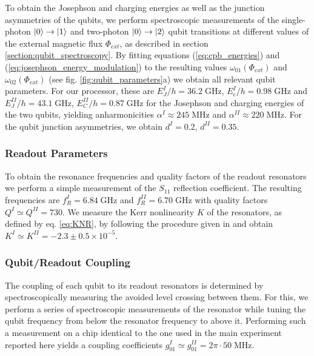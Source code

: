 To obtain the Josephson and charging energies as well as the junction asymmetries of the qubits, we perform spectroscopic measurements of the single-photon $\left| 0 \right>\to \left| 1 \right>$ and two-photon $\left| 0 \right>\to\left| 2 \right>$ qubit transitions at different values of the external magnetic flux $\Phi_{ext}$, as described in section \ref{section:qubit_spectroscopy}. By fitting equations (\ref{eq:cpb_energies}) and (\ref{eq:josephson_energy_modulation}) to the resulting values $\omega_{01}(\Phi_{ext})$ and $\omega_{02}(\Phi_{ext})$ (see fig. \ref{fig:qubit_parameters}a) we obtain all relevant qubit parameters. For our processor, these are $E_J^I / h = 36.2\; \mathrm{GHz}$, $E_c^I / h = 0.98 \; \mathrm{GHz}$ and $E_J^{II} / h = 43.1\; \mathrm{GHz}$, $E_C^{II} / h = 0.87 \; \mathrm{GHz}$ for the Josephson and charging energies of the two qubits, yielding anharmonicities $\alpha^I\approx 245\;\mathrm{MHz}$ and $\alpha^{II}\approx 220\;\mathrm{MHz}$. For the qubit junction asymmetries, we obtain $d^I = 0.2$, $d^{II} =  0.35$.

\subsubsection{Readout Parameters}

To obtain the resonance frequencies and quality factors of the readout resonators we perform a simple measurement of the $S_{11}$ reflection coefficient. The resulting frequencies are $f_R^I = 6.84 \; \mathrm{GHz}$ and $f_R^{II} = 6.70 \; \mathrm{GHz}$ with quality factors $Q^I \simeq Q^{II} = 730$. We measure the Kerr nonlinearity $K$ of the resonators, as defined by eq. \ref{eq:KNR}, by following the procedure given in \citep[p. 166]{palacios-laloy_superconducting_2010} and obtain $K^I \simeq K^{II}= -2.3\pm 0.5 \times 10^{-5}$.

\subsubsection{Qubit/Readout Coupling}

The coupling of each qubit to its readout resonators is determined by spectroscopically measuring the avoided level crossing between them. For this, we perform a series of spectroscopic measurements of the resonator while tuning the qubit frequency from below the resonator frequency to above it. Performing such a measurement on a chip identical to the one used in the main experiment reported here yields a coupling coefficients $g_{01}^I \simeq g_{01}^{II} = 2\pi\cdot 50 \; \mathrm{MHz}$.

